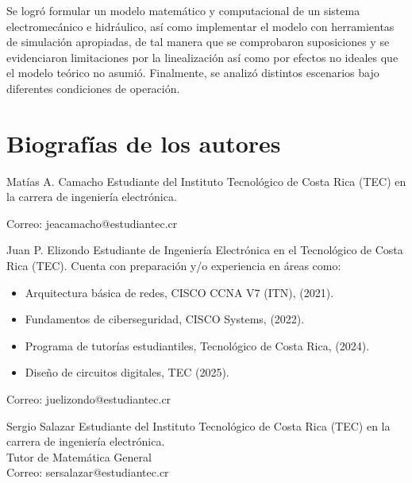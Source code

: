 \documentclass[journal]{IEEEtran}
\begin{document}
Se logró formular un modelo matemático y computacional de un sistema electromecánico e hidráulico, así como implementar el modelo con herramientas de
simulación apropiadas, de tal manera que se comprobaron suposiciones y se evidenciaron limitaciones por la linealización así como por efectos no ideales que el modelo teórico no asumió. Finalmente, se analizó distintos escenarios bajo diferentes condiciones de operación.



\printbibliography

\section{Biografías de los autores}

 
\begin{IEEEbiographynophoto}{Matías A. Camacho}
        Estudiante del Instituto Tecnológico de Costa Rica (TEC) en la carrera de ingeniería electrónica.
        
        Correo: jeacamacho@estudiantec.cr
\end{IEEEbiographynophoto}

\begin{IEEEbiographynophoto}{Juan P. Elizondo}
        Estudiante de Ingeniería Electrónica en el Tecnológico de Costa Rica (TEC).
        Cuenta con preparación y/o experiencia en áreas como:
        \begin{itemize}
            \item Arquitectura básica de redes, CISCO CCNA V7 (ITN), (2021).
            \item Fundamentos de ciberseguridad, CISCO Systems, (2022).
            \item Programa de tutorías estudiantiles, Tecnológico de Costa Rica, (2024).
            \item Diseño de circuitos digitales, TEC (2025).
        \end{itemize}
        
        Correo: juelizondo@estudiantec.cr
\end{IEEEbiographynophoto}

\begin{IEEEbiographynophoto}{Sergio Salazar}
        Estudiante del Instituto Tecnológico de Costa Rica (TEC) en la carrera de ingeniería electrónica.\\
        Tutor de Matemática General\\
        Correo: sersalazar@estudiantec.cr
\end{IEEEbiographynophoto}


\vfill
\end{document}
